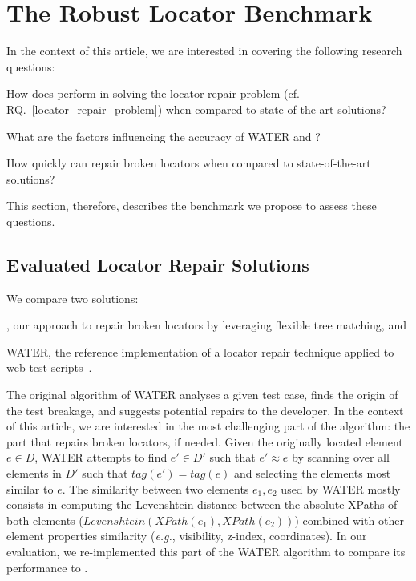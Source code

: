 \documentclass[preprint, 12pt]{elsarticle}
\begin{document}
\section{The Robust Locator Benchmark}\label{sec:benchmark}
In the context of this article, we are interested in covering the following research questions:
\begin{rqn}\label{rq:performance}
    How does \erratum{} perform in solving the locator repair problem (cf. RQ.~\ref{locator_repair_problem}) when compared to state-of-the-art solutions?
\end{rqn}
\begin{rqn}\label{rq:influenceFactors}
    What are the factors influencing the accuracy of WATER and \erratum?
\end{rqn}
\begin{rqn}\label{rq:computationTime}
    How quickly can \erratum{} repair broken locators when compared to state-of-the-art solutions?
\end{rqn}
This section, therefore, describes the benchmark we propose to assess these questions.

\subsection{Evaluated Locator Repair Solutions}\label{sec:consideredSolutions}
We compare two solutions: 
\begin{inparaenum}
    \item \erratum{}, our approach to repair broken locators by leveraging flexible tree matching, and
    \item WATER, the reference implementation of a locator repair technique applied to web test scripts~\cite{choudhary2011water}.
\end{inparaenum}

The original algorithm of WATER analyses a given test case, finds the origin of the test breakage, and suggests potential repairs to the developer.
In the context of this article, we are interested in the most challenging part of the algorithm: the part that repairs broken locators, if needed.
Given the originally located element $e \in D$, WATER attempts to find $e' \in D'$ such that $e' \approx e$ by scanning over all elements in $D'$ such that $tag(e') = tag(e)$ and selecting the elements most similar to $e$. 
The similarity between two elements $e_1, e_2$ used by WATER mostly consists in computing the Levenshtein distance between the absolute XPaths of both elements ($Levenshtein(XPath(e_1), XPath(e_2))$) combined with other element properties similarity (\emph{e.g.}, visibility, z-index, coordinates).
In our evaluation, we re-implemented this part of the WATER algorithm to compare its performance to \erratum{}.
\end{document}
